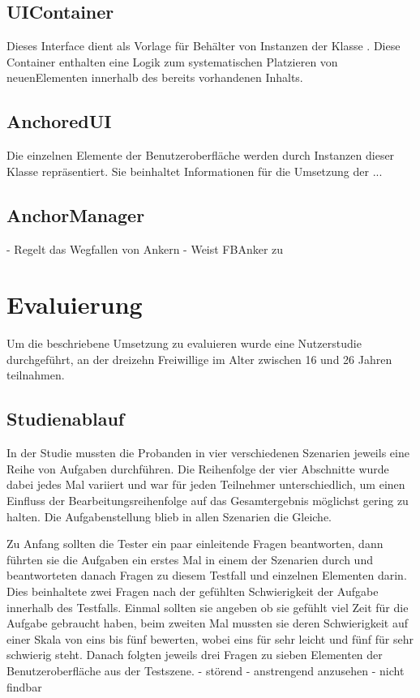 		\subsection{UIContainer}
			Dieses Interface dient als Vorlage für Behälter von Instanzen der Klasse . \linebreak Diese Container enthalten eine Logik zum systematischen Platzieren von neuen\linebreak Elementen innerhalb des bereits vorhandenen Inhalts.
		
		\subsection{AnchoredUI}
			Die einzelnen Elemente der Benutzeroberfläche werden durch Instanzen dieser Klasse repräsentiert. Sie beinhaltet Informationen für die Umsetzung der ...
		
		\subsection{AnchorManager}
			- Regelt das Wegfallen von Ankern
			- Weist FBAnker zu
			
	\section{Evaluierung}
		Um die beschriebene Umsetzung zu evaluieren wurde eine Nutzerstudie durchgeführt, an der dreizehn Freiwillige im Alter zwischen 16 und 26 Jahren teilnahmen.  
	
		\subsection{Studienablauf}
			In der Studie mussten die Probanden in vier verschiedenen Szenarien jeweils eine Reihe von Aufgaben durchführen. Die Reihenfolge der vier Abschnitte wurde dabei jedes Mal variiert und war für jeden Teilnehmer unterschiedlich, um einen Einfluss der Bearbeitungsreihenfolge auf das Gesamtergebnis möglichst gering zu halten. Die Aufgabenstellung blieb in allen Szenarien die Gleiche.
			
			
						
			Zu Anfang sollten die Tester ein paar einleitende Fragen beantworten, dann führten sie die Aufgaben ein erstes Mal in einem der Szenarien durch und beantworteten danach Fragen zu diesem Testfall und einzelnen Elementen darin. 
			Dies beinhaltete zwei Fragen nach der gefühlten Schwierigkeit der Aufgabe innerhalb des Testfalls. Einmal sollten sie angeben ob sie gefühlt viel Zeit für die Aufgabe gebraucht haben, beim zweiten Mal mussten sie deren Schwierigkeit auf einer Skala von eins bis fünf bewerten, wobei eins für sehr leicht und fünf für sehr schwierig steht.
			Danach folgten jeweils drei Fragen zu sieben Elementen der Benutzeroberfläche aus der Testszene.
			- störend - anstrengend anzusehen - nicht findbar
			
